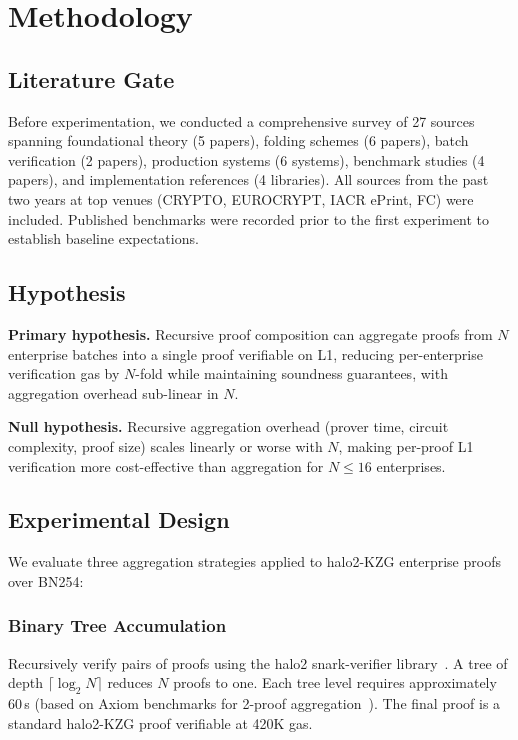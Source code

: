 \section{Methodology}
\label{sec:methodology}

\subsection{Literature Gate}

Before experimentation, we conducted a comprehensive survey of 27
sources spanning foundational theory (5 papers), folding schemes (6
papers), batch verification (2 papers), production systems (6 systems),
benchmark studies (4 papers), and implementation references (4
libraries). All sources from the past two years at top venues (CRYPTO,
EUROCRYPT, IACR ePrint, FC) were included. Published benchmarks were
recorded prior to the first experiment to establish baseline
expectations.

\subsection{Hypothesis}

\textbf{Primary hypothesis.} Recursive proof composition can aggregate
proofs from $N$ enterprise batches into a single proof verifiable on L1,
reducing per-enterprise verification gas by $N$-fold while maintaining
soundness guarantees, with aggregation overhead sub-linear in $N$.

\textbf{Null hypothesis.} Recursive aggregation overhead (prover time,
circuit complexity, proof size) scales linearly or worse with $N$,
making per-proof L1 verification more cost-effective than aggregation
for $N \leq 16$ enterprises.

\subsection{Experimental Design}

We evaluate three aggregation strategies applied to halo2-KZG enterprise
proofs over BN254:

\subsubsection{Binary Tree Accumulation}

Recursively verify pairs of proofs using the halo2 snark-verifier
library~\cite{snark-verifier}. A tree of depth
$\lceil \log_2 N \rceil$ reduces $N$ proofs to one. Each tree level
requires approximately 60\,s (based on Axiom benchmarks for 2-proof
aggregation~\cite{axiom-v2}). The final proof is a standard halo2-KZG
proof verifiable at 420K gas.

